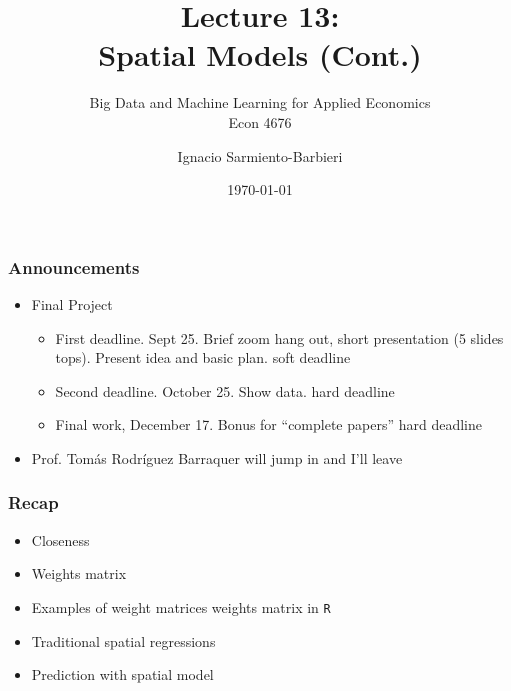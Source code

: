 \documentclass[
  shownotes,
  xcolor={svgnames},
  hyperref={colorlinks,citecolor=DarkBlue,linkcolor=DarkRed,urlcolor=DarkBlue}
  ]{beamer}
\begin{document}
\title[Lecture 13]{Lecture 13: \\ Spatial Models (Cont.)}
\subtitle{Big Data and Machine Learning for Applied Economics \\ Econ 4676}
\date{\today}

\author[Sarmiento-Barbieri]{Ignacio Sarmiento-Barbieri}


\begin{frame}[noframenumbering]
\maketitle
\end{frame}


\begin{frame}
\frametitle{Announcements}

\begin{itemize}
  \item Final Project
  \begin{itemize}
    \item First deadline. Sept 25.  Brief zoom hang out, short presentation (5 slides tops). Present idea and basic plan. \textcolor{airforceblue}{soft deadline}
     \medskip
    \item  Second deadline. October 25. Show data. \textcolor{andesred}{hard deadline}
      \medskip
    \item  Final work, December 17. Bonus for ``complete papers'' \textcolor{andesred}{hard deadline}
  \end{itemize}
\bigskip
    \item Prof. Tomás Rodríguez Barraquer will jump in and I'll leave
\end{itemize}

\end{frame}
\begin{frame}
\frametitle{Recap }

  \begin{itemize} 
        \item Closeness
        \medskip
        \item Weights matrix
        \medskip
        \item Examples of weight matrices weights matrix in \texttt{R}
        \medskip
        \item Traditional spatial regressions
        \medskip
        \item Prediction with spatial model 
  \end{itemize}

\end{frame}
\end{document}
